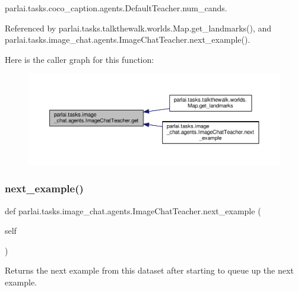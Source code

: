 parlai.\+tasks.\+coco\+\_\+caption.\+agents.\+Default\+Teacher.\+num\+\_\+cands.



Referenced by parlai.\+tasks.\+talkthewalk.\+worlds.\+Map.\+get\+\_\+landmarks(), and parlai.\+tasks.\+image\+\_\+chat.\+agents.\+Image\+Chat\+Teacher.\+next\+\_\+example().

Here is the caller graph for this function\+:
\nopagebreak
\begin{figure}[H]
\begin{center}
\leavevmode
\includegraphics[width=350pt]{classparlai_1_1tasks_1_1image__chat_1_1agents_1_1ImageChatTeacher_ac7212c1001ab9c5027ae305ffdc9298f_icgraph}
\end{center}
\end{figure}
\mbox{\label{classparlai_1_1tasks_1_1image__chat_1_1agents_1_1ImageChatTeacher_a2b795770610618bf94e76705cb90611a}} 
\subsubsection{\texorpdfstring{next\+\_\+example()}{next\_example()}}
{\footnotesize\ttfamily def parlai.\+tasks.\+image\+\_\+chat.\+agents.\+Image\+Chat\+Teacher.\+next\+\_\+example (\begin{DoxyParamCaption}\item[{}]{self }\end{DoxyParamCaption})}

\begin{DoxyVerb}Returns the next example from this dataset after starting to queue
up the next example.
\end{DoxyVerb}
 

